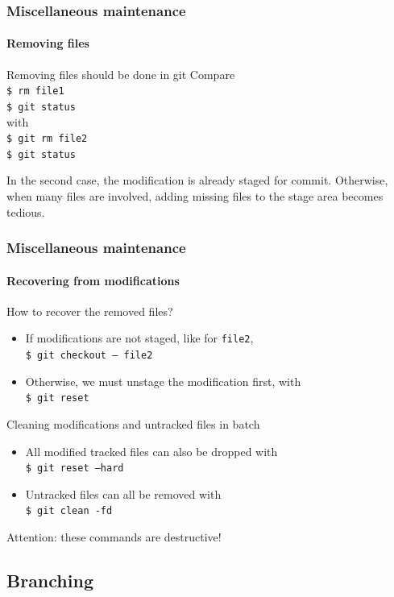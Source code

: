 \begin{frame}
\frametitle{Miscellaneous maintenance}
\framesubtitle{Removing files}

\begin{block}{Removing files should be done in git}
Compare \\
\texttt{\$ rm file1} \\
\texttt{\$ git status} \\
with \\
\texttt{\$ git rm file2} \\
\texttt{\$ git status} 

\medskip
In the second case, the modification is already staged for commit. Otherwise, when many files are involved, adding missing files to the stage area becomes tedious.
\end{block}

\end{frame}


\begin{frame}
\frametitle{Miscellaneous maintenance}
\framesubtitle{Recovering from modifications}

\begin{block}{How to recover the removed files?}
\begin{itemize}
\item If modifications are not staged, like for \texttt{file2}, \\
\texttt{\$ git checkout --- file2}
\item Otherwise, we must unstage the modification first, with \\
\texttt{\$ git reset}
\end{itemize}
\end{block}

\begin{block}{Cleaning modifications and untracked files in batch}
\begin{itemize}
\item All modified tracked files can also be dropped with \\
\texttt{\$ git reset ---hard}
\item Untracked files can all be removed with \\
\texttt{\$ git clean -fd}
\end{itemize}
Attention: these commands are destructive!
\end{block}

\end{frame}

\subsection{Branching}

